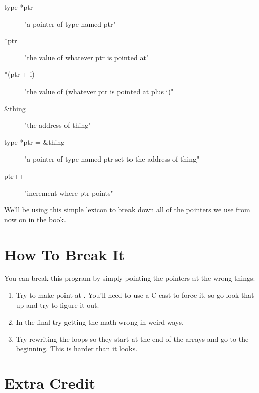 \begin{description}
\item[type *ptr] "a pointer of type named ptr"
\item[*ptr] "the value of whatever ptr is pointed at"
\item[*(ptr + i)] "the value of (whatever ptr is pointed at plus i)"
\item[\&thing] "the address of thing"
\item[type *ptr = \&thing] "a pointer of type named ptr set to the address of thing"
\item[ptr++] "increment where ptr points"
\end{description}

We'll be using this simple lexicon to break down all of the pointers
we use from now on in the book.


\section{How To Break It}

You can break this program by simply pointing the pointers at the wrong things:

\begin{enumerate}
\item Try to make  point at .  You'll need to
    use a C cast to force it, so go look that up and try to figure it out.
\item In the final  try getting the math wrong in weird ways.
\item Try rewriting the loops so they start at the end of the arrays and go
    to the beginning.  This is harder than it looks.
\end{enumerate}

\section{Extra Credit}

